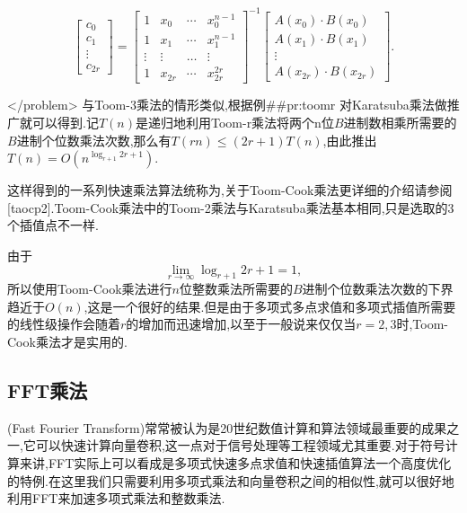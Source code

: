 \documentclass{ctexart}
\newcommand\mtcasCite[1]{[#1]}
\begin{document}
\begin{equation*}
  \begin{bmatrix}
    c_0\\
    c_1\\
    \vdots\\
    c_{2r}
  \end{bmatrix}
=
  \begin{bmatrix}
    1 & x_0 & \cdots & x_0^{n-1}\\
    1 & x_1 & \cdots & x_1^{n-1}\\
    \vdots & \vdots & \ldots & \vdots\\
    1 & x_{2r} & \cdots & x_{2r}^{2r}
  \end{bmatrix}
^{-1}
  \begin{bmatrix}
    A(x_0)\cdot B(x_0)\\
    A(x_1)\cdot B(x_1)\\
    \vdots\\
    A(x_{2r})\cdot B(x_{2r})
  \end{bmatrix}.
\end{equation*}

</problem>
与Toom-3乘法的情形类似,根据例##pr:toomr 对Karatsuba乘法做推广就可以得到.记$T(n)$是递归地利用Toom-r乘法将两个n位$B$进制数相乘所需要的$B$进制个位数乘法次数,那么有$T(rn)\le (2r+1)T(n)$,由此推出$T(n)=O(n^{\log_{r+1}{2r+1}})$.

这样得到的一系列快速乘法算法统称为,关于Toom-Cook乘法更详细的介绍请参阅\mtcasCite{taocp2}.Toom-Cook乘法中的Toom-2乘法与Karatsuba乘法基本相同,只是选取的3个插值点不一样.

由于$$\lim_{r\rightarrow\infty}\log_{r+1}{2r+1}=1,$$所以使用Toom-Cook乘法进行$n$位整数乘法所需要的$B$进制个位数乘法次数的下界趋近于$O(n)$,这是一个很好的结果.但是由于多项式多点求值和多项式插值所需要的线性级操作会随着$r$的增加而迅速增加,以至于一般说来仅仅当$r=2,3$时,Toom-Cook乘法才是实用的.

\subsection{FFT乘法}

(Fast Fourier Transform)常常被认为是20世纪数值计算和算法领域最重要的成果之一,它可以快速计算向量卷积,这一点对于信号处理等工程领域尤其重要.对于符号计算来讲,FFT实际上可以看成是多项式快速多点求值和快速插值算法一个高度优化的特例.在这里我们只需要利用多项式乘法和向量卷积之间的相似性,就可以很好地利用FFT来加速多项式乘法和整数乘法.
\end{document}
